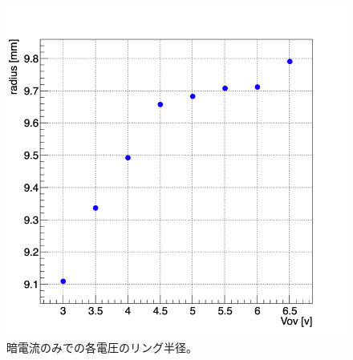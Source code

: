 \documentclass[uplatex, titlepage, dvipdfmx, 12pt, a4paper]{jsreport}
\begin{document}
      \begin{figure}[hbtp]
        \begin{center} 
          \includegraphics[scale=0.4, clip]{image/background_radius.png}
          \caption{暗電流のみでの各電圧のリング半径。}
          \label{fig:darkcurrent_radius} 
        \end{center}
      \end{figure}
\end{document}
